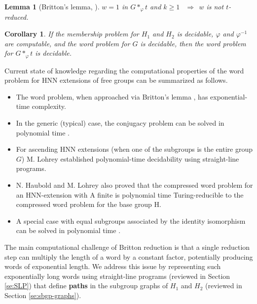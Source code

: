 \documentclass[12pt,oneside]{amsart}
\newtheorem{lemma}[theorem]{Lemma}
\newtheorem{corollary}[theorem]{Corollary}
\theoremstyle{definition}
\theoremstyle{case}
\newcommand{\hanwen}[1]{\todo[inline,color=cyan]{\footnotesize Hanwen: #1}}
\begin{document}
\begin{lemma}[Britton's lemma, \cite{brittonWordProblem1963}]
$w=1$ in $G\ast_\varphi t$ and $k\ge 1$
$\ \ \Rightarrow\ \ w$ is not $t$-reduced.
\end{lemma}

\begin{corollary}
If the membership problem for $H_1$ and $H_2$ is decidable,
$\varphi$ and $\varphi^{-1}$ are computable, and the word problem
for $G$ is decidable,
then the word problem for $G\ast_\varphi t$ is decidable.
\end{corollary}

Current state of knowledge regarding the computational properties of the word problem for HNN extensions of free groups can be summarized as follows.
\begin{itemize}
\item 
The word problem, when approached via Britton’s lemma \cite{brittonWordProblem1963}, has exponential-time complexity.
\item 
In the generic (typical) case, the conjugacy problem can be solved in 
polynomial time \cite{borovikGenericComplexityConjugacy2009, Weiss2015}.
\item 
For ascending HNN extensions (when one of the subgroups is the entire group $G$)
M. Lohrey \cite{lohreyComplexityWordProblems2023} established polynomial-time decidability using straight-line programs. 
\item 
N. Haubold and M. Lohrey \cite{hauboldCompressedWordProblems} also proved that the compressed word problem for an HNN-extension with A finite is polynomial time Turing-reducible to the compressed word problem for the base group H.
\item 
A special case with equal subgroups associated by the identity
isomorphism can be solved in polynomial time \cite{Waack:1990}.
\end{itemize}

The main computational challenge of Britton reduction is that a single 
reduction step can multiply the length of a word by a constant factor, 
potentially producing words of exponential length.
We address this issue by representing such exponentially long words using 
straight-line programs (reviewed in Section \ref{se:SLP}) that define 
\textbf{paths} in the subgroup graphs of 
$H_1$ and $H_2$ (reviewed in Section \ref{se:sbgp-graphs}).
  
\end{document}
